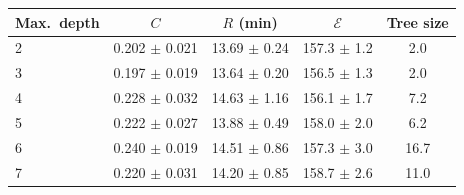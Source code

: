 \begin{tabular}{lcccc}\toprule
Max.\ depth & $C$ & $R$ (min) & $\mathcal{E}$ & Tree size\\\midrule
2 & 0.202 $\pm$ 0.021 & 13.69 $\pm$ 0.24 & 157.3 $\pm$ 1.2 & 2.0\\
3 & 0.197 $\pm$ 0.019 & 13.64 $\pm$ 0.20 & 156.5 $\pm$ 1.3 & 2.0\\
4 & 0.228 $\pm$ 0.032 & 14.63 $\pm$ 1.16 & 156.1 $\pm$ 1.7 & 7.2\\
5 & 0.222 $\pm$ 0.027 & 13.88 $\pm$ 0.49 & 158.0 $\pm$ 2.0 & 6.2\\
6 & 0.240 $\pm$ 0.019 & 14.51 $\pm$ 0.86 & 157.3 $\pm$ 3.0 & 16.7\\
7 & 0.220 $\pm$ 0.031 & 14.20 $\pm$ 0.85 & 158.7 $\pm$ 2.6 & 11.0\\
\bottomrule
\end{tabular}